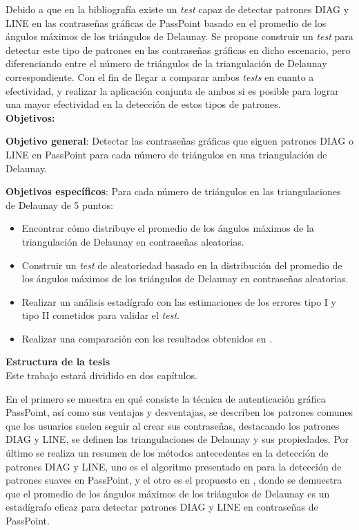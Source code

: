 \documentclass[12pt]{report}
\begin{document}
	\normalsize{
		Debido a que en la bibliografía existe un \textit{test} capaz de detectar patrones DIAG y LINE en las contraseñas gráficas de PassPoint basado en el promedio de los ángulos máximos de los triángulos de Delaunay. Se propone construir un \textit{test} para detectar este tipo de patrones en las contraseñas gráficas en dicho escenario, pero diferenciando entre el número de triángulos de la triangulación de Delaunay correspondiente. Con el fin de llegar a comparar ambos \textit{tests} en cuanto a efectividad, y realizar la aplicación conjunta de ambos si es posible para lograr una mayor efectividad en la detección de estos tipos de patrones.
		}\\

	\large{\textbf{Objetivos:}}
	
	\normalsize{\textbf{Objetivo general}}: Detectar las contraseñas gráficas que siguen patrones DIAG o LINE en PassPoint para cada número de triángulos en una triangulación de Delaunay.
	
	\normalsize{\textbf{Objetivos específicos}}:
	Para cada número de triángulos  en las triangulaciones de Delaunay de 5 puntos:
	
	\begin{itemize}
		\item Encontrar cómo distribuye el promedio de los ángulos máximos de la triangulación de Delaunay en contraseñas aleatorias.
		\item Construir un \textit{test} de aleatoriedad basado en la distribución del promedio de los ángulos máximos de los triángulos de Delaunay en contraseñas aleatorias.
		
		\item Realizar un análisis estadígrafo con las estimaciones de los errores tipo I y tipo II cometidos para validar el \textit{test}.
		
		\item Realizar una comparación con los resultados obtenidos en \cite{13}.
		
	\end{itemize}
	
	
	{\large{\textbf{Estructura de la tesis}}}\\
	
	Este trabajo estará dividido en dos capítulos.
	
	En el primero se muestra en qué consiste la técnica de autenticación gráfica PassPoint, así como sus ventajas y desventajas, se describen los patrones comunes que los usuarios suelen seguir al crear sus contraseñas, destacando los patrones DIAG y LINE, se definen las triangulaciones de Delaunay y sus propiedades. Por último se realiza un resumen  de los métodos antecedentes en la detección de patrones DIAG y LINE, uno es el algoritmo presentado en \cite{3} para la detección de patrones suaves en PassPoint, y el otro es el propuesto en \cite{13}, donde se demuestra que el promedio de los ángulos máximos de los  triángulos de Delaunay es un estadígrafo eficaz para detectar patrones DIAG y LINE en contraseñas de PassPoint.
	
\end{document}
